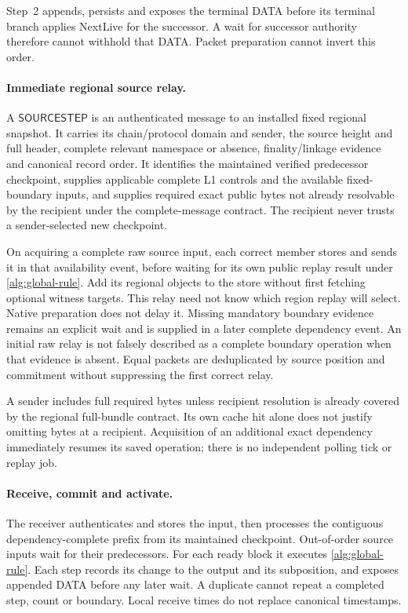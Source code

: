 \documentclass[11pt,a4paper]{article}
\newcommand{\tagg}[1]{\ensuremath{\mathsf{#1}}}
\newcounter{protocol}
\begin{document}
Step~2 appends, persists and exposes the terminal DATA before its
terminal branch applies NextLive for the successor. A wait for successor
authority therefore cannot withhold that DATA. Packet preparation cannot
invert this order.

\paragraph{Immediate regional source relay.}
A \tagg{SOURCESTEP} is an authenticated message to an installed fixed
regional snapshot. It carries its chain/protocol domain and sender,
the source height and full header, complete relevant namespace or
absence, finality/linkage evidence and canonical record order. It
identifies the maintained verified predecessor checkpoint, supplies
applicable complete L1 controls and the available fixed-boundary
inputs, and supplies required exact public bytes not already resolvable
by the recipient under the complete-message contract. The
recipient never trusts a sender-selected new checkpoint.

On acquiring a complete raw source input, each correct member stores
and sends it in that availability event, before waiting for its own
public replay result under \cref{alg:global-rule}. Add its regional objects to the store
without first fetching optional witness targets. This relay
need not know which region replay will select. Native preparation does
not delay it. Missing mandatory boundary evidence remains an explicit
wait and is supplied in a later complete dependency event. An initial
raw relay is not falsely described as a complete boundary operation
when that evidence is absent. Equal packets are deduplicated by source
position and commitment without suppressing the first correct relay.

A sender includes full required bytes unless recipient resolution is
already covered by the regional full-bundle contract. Its own cache hit
alone does not justify omitting bytes at a recipient. Acquisition of an
additional exact dependency immediately resumes its saved operation;
there is no independent polling tick or replay job.

\paragraph{Receive, commit and activate.}
The receiver authenticates and stores the input, then processes the
contiguous dependency-complete prefix from its maintained checkpoint.
Out-of-order source inputs wait for their predecessors. For each ready
block it executes \cref{alg:global-rule}. Each step records its change to the output and
its subposition, and exposes appended DATA before any later wait. A
duplicate cannot repeat a completed step, count or boundary. Local
receive times do not replace canonical timestamps.
\end{document}

